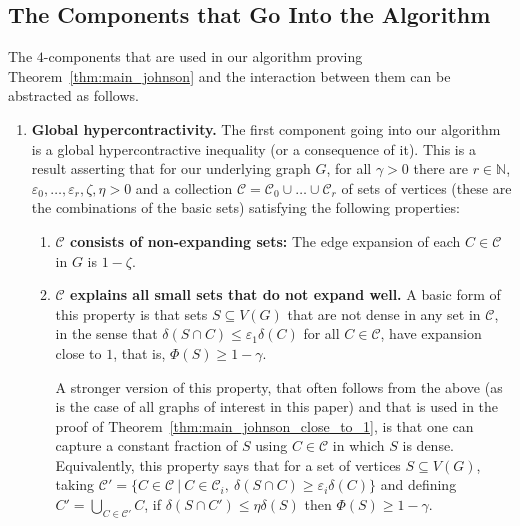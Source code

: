 \documentclass[11pt]{article}
\def \eps {{\varepsilon}}
\theoremstyle{definition}
\begin{document}
\subsection{The Components that Go Into the Algorithm}\label{sec:abstraction}
The $4$-components that are used in 
our algorithm proving Theorem~\ref{thm:main_johnson} 
and the interaction between them can be abstracted as follows.
\begin{enumerate}
    \item \textbf{Global hypercontractivity.}\label{def:global-hypcont} 
    The first component going into our algorithm is a global hypercontractive inequality (or a consequence of it).
    This is a result asserting that 
    for our underlying graph $G$, for all $\gamma>0$ there are $r\in\mathbb{N}$, 
    $\eps_0,\ldots,\eps_r,\zeta,\eta>0$ and a collection 
    $\mathcal{C} = \mathcal{C}_0\cup\ldots\cup\mathcal{C}_r$ of sets of vertices (these are the combinations 
    of the basic sets) satisfying the following properties: 
    \begin{enumerate}
        \item 
        \textbf{$\mathcal{C}$ consists of non-expanding sets:} 
        The edge expansion of each $C\in\mathcal{C}$ in $G$ is $1-\zeta$.
        \item 
        \textbf{$\mathcal{C}$ explains all small sets that 
        do not expand well.} A basic form of this property 
        is that sets $S\subseteq V(G)$ that are not dense in 
        any set in $\mathcal{C}$, in the sense that $\delta(S\cap C)\leq \eps_1\delta(C)$
        for all $C\in\mathcal{C}$, have expansion close to $1$, that is, $\Phi(S)\geq 1-\gamma$.
        
        A stronger version of this property, that often follows from the above (as is the case of all graphs of interest in this paper) and that is used in the proof of Theorem~\ref{thm:main_johnson_close_to_1}, is that 
        one can capture a constant fraction of $S$ using $C\in\mathcal{C}$ in which $S$ is dense. 
        Equivalently, this property says that for a set of vertices $S\subseteq V(G)$, taking $\mathcal{C}' = \{C\in\mathcal{C}~|~C\in\mathcal{C}_i,~\delta(S\cap C)\geq \eps_i \delta(C)\}$ and defining $C' = \bigcup_{C\in \mathcal{C}'}C$, if $\delta(S\cap C')\leq \eta \delta(S)$ then
        $\Phi(S)\geq 1-\gamma$.
        

\end{enumerate}
\end{enumerate}
\end{document}
